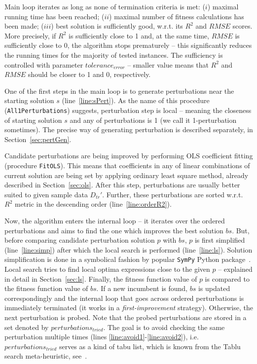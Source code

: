 \documentclass[a4paper,12pt]{elsarticle}
\begin{document}
Main loop iterates as long as none of termination criteria is met: ($i$) maximal running time has been reached; ($ii$) maximal number of fitness calculations has been made; ($iii$) best solution is sufficiently good, 
w.r.t. its $R^2$ and $RMSE$ scores. More precisely, if $R^2$ is sufficiently close to 1 and, at the same time, $RMSE$ is sufficiently close to 0, the algorithm stops prematurely -- this significantly reduces the running times for the majority of tested instances.
The sufficiency is controlled with parameter $tolerance_{error}$ -- smaller value means that $R^2$ and $RMSE$ should be closer to 1 and 0, respectively. 


One of the first steps in the main loop is to generate perturbations near the starting solution $s$ (line~\ref{line:sPert}). 
As the name of this procedure (\texttt{All1Perturbations}) suggests, perturbation step is local -- meaning the closeness of starting solution $s$ and any of perturbations is 1 (we call it 1-perturbation sometimes). The precise way of generating perturbation is described separately, in Section~\ref{sec:pertGen}. 
 

Candidate perturbations are being improved by performing OLS coefficient fitting (procedure \texttt{FitOLS}). This means that coefficients in any of linear combinations of current solution are being set by applying  ordinary least square method, already described in Section~\ref{sec:ols}.   
After this step, perturbations are usually better suited to given sample data $D_{tr}'$. 
Further, these perturbations are sorted w.r.t. $R^2$ metric in the descending order (line~\ref{line:orderR2}). 

Now, the algorithm enters the internal loop -- it iterates over the ordered perturbations and aims to find the one which improves the best solution $bs$. But, before comparing candidate perturbation solution $p$ with $bs$, $p$ is first simplified (line~\ref{line:simp}) after which the local search is performed (line~\ref{line:ls}).
Solution simplification is done in a symbolical fashion by popular \texttt{SymPy} Python package~\cite{sympy}.
Local search tries to find local optima expressions close to the given $p$ -- explained in detail in Section~\ref{sec:ls}.  
Finally, the fitness function value of $p$ is compared to the fitness function value of $bs$. If a new incumbent is found, $bs$ is updated correspondingly and the internal loop that goes across ordered perturbations is immediately terminated (it works in a  \emph{first-improvement} strategy). Otherwise, the next perturbation is probed. 
Note that the probed perturbations are stored in a set denoted by $perturbations_{tried}$. The goal is to avoid checking the same perturbation multiple times (lines \ref{line:avoid1}-\ref{line:avoid2}), i.e. $perturbations_{tried}$ serves as a kind of tabu list, which is known from the Tablu search meta-heuristic, see~\cite{glover1998tabu}.    
\end{document}
